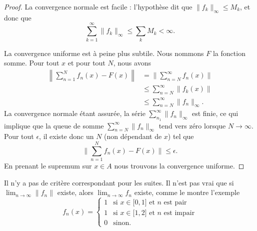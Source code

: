 \begin{proof}
    La convergence normale est facile : l'hypothèse dit que \( \| f_k \|_{\infty}\leq M_k\), et donc que
    \begin{equation}
        \sum_{k=1}^{\infty}\| f_k \|_{\infty}\leq \sum_kM_k<\infty.
    \end{equation}

    La convergence uniforme est à peine plus subtile. Nous nommons \( F\) la fonction somme. Pour tout \( x\) et pour tout \( N\), nous avons
    \begin{subequations}
        \begin{align}
            \left\| \sum_{n=1}^Nf_n(x)-F(x) \right\|&=\| \sum_{n=N}^{\infty}f_n(x) \|\\
            &\leq\sum_{n=N}^{\infty}\| f_k(x) \|\\
            &\leq \sum_{n=N}^{\infty}\| f_n \|_{\infty}.
        \end{align}
    \end{subequations}
    La convergence normale étant assurée, la série \( \sum_{n_1}^{\infty}\| f_n \|_{\infty}\) est finie, ce qui implique que la queue de somme \( \sum_{n=N}^{\infty}\| f_n \|_{\infty}\) tend vers zéro lorsque \( N\to \infty\). Pour tout \( \epsilon\), il existe donc un \( N\) (non dépendant de \( x\)) tel que
    \begin{equation}
        \| \sum_{n=1}^Nf_n(x)-F(x) \|\leq \epsilon.
    \end{equation}
    En prenant le supremum sur \( x\in A\) nous trouvons la convergence uniforme.
\end{proof}

\begin{remark}
    Il n'y a pas de critère correspondant pour les suites. Il n'est pas vrai que si \( \lim_{n\to \infty}\| f_n \| \) existe, alors \( \lim_{n\to \infty} f_n\) existe, comme le montre l'exemple
    \begin{equation}
        f_n(x)=\begin{cases}
            1    &   \text{si } x\in\mathopen[ 0 , 1 \mathclose]\text{ et } n\text{ est pair}\\
            1    &    \text{si } x\in\mathopen[ 1 , 2 \mathclose]\text{ et } n\text{ est impair}\\
             0   &    \text{sinon.}
        \end{cases}
    \end{equation}
\end{remark}


